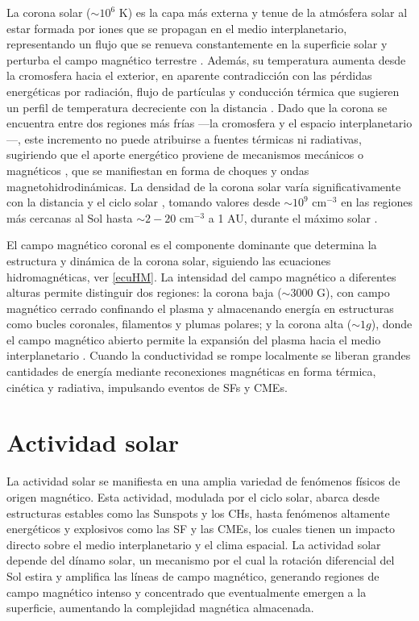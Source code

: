 La corona solar ($\sim 10^{6}$ K) es la capa más externa y tenue de la atmósfera solar al estar formada por iones  que se propagan en el medio interplanetario, representando un flujo que se renueva constantemente en la superficie solar y perturba el campo magnético terrestre \parencite[][]{chapman-1957}. Además, su temperatura aumenta desde la cromosfera hacia el exterior, en aparente contradicción con las pérdidas energéticas por radiación, flujo de partículas y conducción térmica que sugieren un perfil de temperatura decreciente con la distancia \parencite[e.g.,][]{korolkov-2022, marsch-2006, richardson-2003}. Dado que la corona se encuentra entre dos regiones más frías —la cromosfera y el espacio interplanetario—, este incremento no puede atribuirse a fuentes térmicas ni radiativas, sugiriendo que el aporte energético proviene de mecanismos mecánicos o magnéticos \parencite[e.g.,][]{klimchuk-2006, walsh-2003, sakurai-2017, billings-1966}, que se manifiestan en forma de choques y ondas magnetohidrodinámicas. La densidad de la corona solar varía significativamente con la distancia y el ciclo solar \parencite[e.g.,][]{wang-2017}, tomando valores desde $\sim10^{9}$ cm$^{-3}$ en las regiones más cercanas al Sol hasta $\sim2-20$ cm$^{-3}$ a 1 AU, durante el máximo solar \parencite[e.g.,][]{mercier-2015, billings-1966}.

El campo magnético coronal es el componente dominante que determina la estructura y dinámica de la corona solar, siguiendo las ecuaciones hidromagnéticas, ver \autoref{ecuHM}. La intensidad del campo magnético a diferentes alturas permite distinguir dos regiones: la corona baja ($\sim3000$ G), con campo magnético cerrado confinando el plasma y almacenando energía en estructuras como bucles coronales, filamentos y plumas polares; y la corona alta ($\sim1 g$), donde el campo magnético abierto permite la expansión del plasma hacia el medio interplanetario \parencite[e.g.,][]{billings-1966, yang-2024, anfinogentov-2019}. Cuando la conductividad se rompe localmente se liberan grandes cantidades de energía mediante reconexiones magnéticas en forma térmica, cinética y radiativa, impulsando eventos de \acsp{SF} \parencite[e.g.,][]{1969ARA&A...7..149S, schrijver-2008} y CMEs.

\section{Actividad solar}
La actividad solar se manifiesta en una amplia variedad de fenómenos físicos de origen magnético. Esta actividad, modulada por el ciclo solar, abarca desde estructuras estables como las \ac{Sunspots} y los \acp{CH}, hasta fenómenos altamente energéticos y explosivos como las \ac{SF} y las \acp{CME}, los cuales tienen un impacto directo sobre el medio interplanetario y el clima espacial. La actividad solar depende del dínamo solar, un mecanismo por el cual la rotación diferencial del Sol estira y amplifica las líneas de campo magnético, generando regiones de campo magnético intenso y concentrado que eventualmente emergen a la superficie, aumentando la complejidad magnética almacenada.

